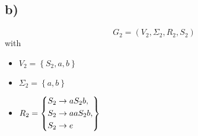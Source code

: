 \subsection*{b)}


\begin{equation*}
  G_2 = \left( V_2, \Sigma_2, R_2, S_2 \right)
\end{equation*}
with
\begin{multicols}{3}
  \raggedcolumns
  \centering
  \begin{itemize}
    \vspace*{\fill}
      \item[] $V_2 = \left\{ S_2, a, b \right\}$
    \vspace*{\fill}

    \columnbreak
    
    \vspace*{\fill}
      \item[] $\Sigma_2 = \left\{ a, b \right\}$
    \vspace*{\fill}
    
    \columnbreak

    \vspace*{\fill}
      \item[] $R_2 = \left\{
        \begin{aligned}
          &S_2 \rightarrow aS_2b,\\
          &S_2 \rightarrow aaS_2b,\\
          &S_2 \rightarrow e
        \end{aligned} \right\}$
    \vspace*{\fill}
  \end{itemize}
\end{multicols}



